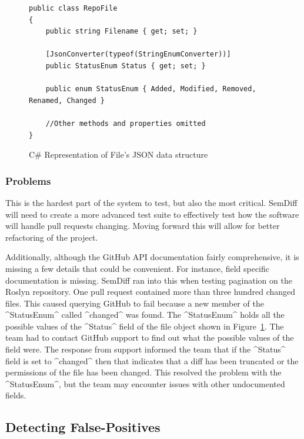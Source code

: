 \documentclass[draftclsnofoot,onecolumn]{IEEEtran}
\begin{document}
\begin{figure}[t]
\centering
\begin{lstlisting}
public class RepoFile
{
    public string Filename { get; set; }

    [JsonConverter(typeof(StringEnumConverter))]
    public StatusEnum Status { get; set; }

    public enum StatusEnum { Added, Modified, Removed, Renamed, Changed }
    
    //Other methods and properties omitted
}
\end{lstlisting}
\caption{ C\# Representation of File's JSON data structure}
\label{GitHubFiles}
\end{figure}



\subsubsection{Problems}

This is the hardest part of the system to test, but also the most critical. SemDiff will need to create a more advanced test suite to effectively test how the software will handle pull requests changing. Moving forward this will allow for better refactoring of the project.

Additionally, although the GitHub API documentation fairly comprehensive, it is missing a few details that could be convenient. For instance, field specific documentation is missing. SemDiff ran into this when testing pagination on the Roslyn repository. One pull request contained more than three hundred changed files. This caused querying GitHub to fail because a new member of the ^StatusEnum^ called ^changed^ was found. The ^StatusEnum^ holds all the possible values of the ^Status^ field of the file object shown in Figure~\ref{GitHubFiles}. The team had to contact GitHub support to find out what the possible values of the field were. The response from support informed the team that if the ^Status^ field is set to ^changed^ then that indicates that a diff has been truncated or the permissions of the file has been changed. This resolved the problem with the ^StatusEnum^, but the team may encounter issues with other undocumented fields.

\newpage

\subsection{Detecting False-Positives}%
\end{document}
